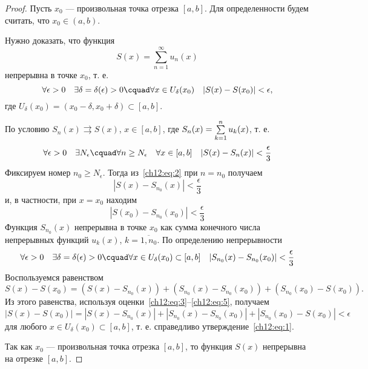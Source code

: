 \begin{proof}
	Пусть $x_0$ --- произвольная точка отрезка $[a, b]$. Для определенности будем считать,
	что $x_0 \in (a, b)$.

	Нужно доказать, что функция
	$$
		S(x) = \sum_{n=1}^{\infty} u_n(x)
	$$
	непрерывна в точке $x_0$, т. е.
	\begin{equation}
		\label{ch12:eq:1}
		\forall \epsilon > 0 \quad \exists \delta = \delta(\epsilon) > 0 \cquad
			\forall x \in U_{\delta}(x_0) \quad |S(x) - S(x_0)| < \epsilon,
	\end{equation}
	где $U_{\delta}(x_0) = (x_0 - \delta, x_0 + \delta) \subset [a, b]$.

	По условию $S_n(x) \rightrightarrows S(x)$, $x \in [a, b]$,
	где $S_n(x) = \sum_{k=1}^{n}\limits u_k(x)$, т. е.
	\begin{equation}
		\label{ch12:eq:2}
		\forall \epsilon > 0 \quad \exists N_{\epsilon} \cquad \forall n \ge N_{\epsilon} \quad
			\forall x \in [a, b] \quad |S(x) - S_n(x)| < \frac{\epsilon}{3}
	\end{equation}
	Фиксируем номер $n_0 \ge N_{\epsilon}$. Тогда из~\eqref{ch12:eq:2} при $n = n_0$ получаем
	\begin{equation}
		\label{ch12:eq:3}
		|S(x) - S_{n_0}(x)| < \frac{\epsilon}{3}
	\end{equation}
	и, в частности, при $x = x_0$ находим
	\begin{equation}
		\label{ch12:eq:4}
		|S(x_0) - S_{n_0}(x_0)| < \frac{\epsilon}{3}
	\end{equation}
	Функция $S_{n_0}(x)$ непрерывна в точке $x_0$ как сумма конечного числа непрерывных функций
	$u_k(x)$, $k = \overline{1, n_0}$. По определению непрерывности
	\begin{equation}
		\label{ch12:eq:5}
		\forall \epsilon > 0 \quad \exists \delta = \delta(\epsilon) > 0 \cquad
			\forall x \in U_\delta(x_0) \subset [a, b] \quad |S_{n_0}(x) - S_{n_0}(x_0)| < \frac{\epsilon}{3}
	\end{equation}
	Воспользуемся равенством
	$$
		S(x) - S(x_0) = (S(x) - S_{n_0}(x)) + (S_{n_0}(x) - S_{n_0}(x_0)) + (S_{n_0}(x_0) - S(x_0)).
	$$
	Из этого равенства, используя оценки~\eqref{ch12:eq:3}--\eqref{ch12:eq:5}, получаем
	$$
		|S(x) - S(x_0)| = |S(x) - S_{n_0}(x)| + |S_{n_0}(x) - S_{n_0}(x_0)| + |S_{n_0}(x_0) - S(x_0)| < \epsilon
	$$
	для любого $x \in U_\delta(x_0) \subset [a, b]$, т. е. справедливо утверждение~\eqref{ch12:eq:1}.

	Так как $x_0$ --- произвольная точка отрезка $[a, b]$, то функция $S(x)$ непрерывна на отрезке $[a, b]$.
\end{proof}

